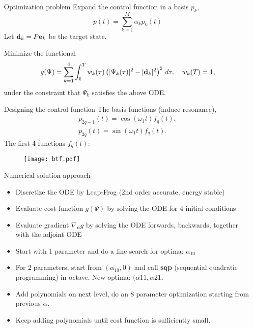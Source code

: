 \documentclass{beamer}
\newcommand{\db}{{\bf d}}
\newcommand{\eb}{{\bf e}}
\begin{document}
\begin{frame}{Optimization problem}
  Expand the control function in a basis $p_k$,
  \[
  p(t) = \sum_{k=1}^M \alpha_k p_k(t)
  \]
  Let $\db_k=P\eb_k$ be the target state.

  Minimize the functional
  \[
  g(\Psi) = \sum_{k=1}^4 \int_0^T w_k(\tau) \left( |\Psi_k(\tau)|^2 -
  |\db_k|^2\right)^2\, d\tau,\quad w_k(T) = 1,
  \]
  under the constraint that $\Psi_k$ satisfies the above ODE.
\end{frame}

\begin{frame}{Designing the control function}
  The basis functions (induce resonance),
  \begin{align*}
    p_{2q-1}(t) = \cos(\omega_1 t) f_q(t),\\
    p_{2q}(t) = \sin(\omega_1 t) f_q(t).
  \end{align*}
  The first 4 functions $f_q(t)$:
  \begin{figure}
    \texttt{[image: btf.pdf]}
  \end{figure}
\end{frame}

\begin{frame}{Numerical solution approach}
  \begin{itemize}
    \item Discretize the ODE by Leap-Frog (2nd order accurate, energy
      stable)
    \item Evaluate cost function $g(\Psi)$ by solving the ODE for 4 initial conditions
    \item Evaluate gradient $\nabla_\alpha g$ by solving the ODE
      forwards, backwards, together with the adjoint ODE
    \item Start with 1 parameter and do a line search for optima: $\alpha_{10}$
    \item For 2 parameters, start from $(\alpha_{10},0)$ and call {\bf
      sqp} (sequential quadratic programming) in octave. New optima: $(\alpha{11},\alpha{21}$.
    \item Add polynomials on next level, do an 8 parameter
      optimization starting from previous $\alpha$.
    \item Keep adding polynomials until cost function is sufficiently small.      
  \end{itemize}
\end{frame}
\end{document}
